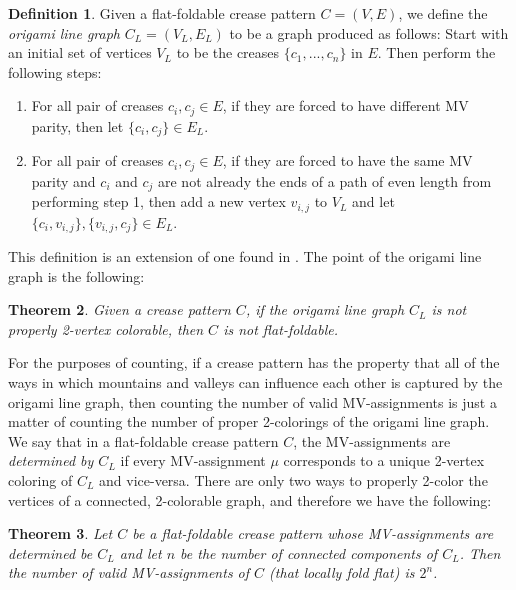 \documentclass{amsart}
\newtheorem{theorem}{Theorem}[section]
\theoremstyle{definition}
\newtheorem{definition}[theorem]{Definition}
\begin{document}
\begin{definition}\label{def:origami line graph}
Given a flat-foldable crease pattern $C=(V,E)$, we define the {\em origami line graph} $C_L=(V_L,E_L)$ to be a graph produced as follows:  Start with an initial set of vertices $V_L$ to be the creases $\{c_1, ..., c_n\}$ in $E$.  Then perform the following steps:
\begin{enumerate}
\setlength{\itemsep}{0pt}
\item For all pair of creases $c_i, c_j\in E$, if they are forced to have different MV parity, then let $\{c_i,c_j\}\in E_L$.
\item For all pair of creases $c_i, c_j\in E$, if they are forced to have the same MV parity and $c_i$ and $c_j$ are not already the ends of a path of even length from performing step 1, then add a new vertex $v_{i,j}$ to $V_L$ and let $\{c_i, v_{i,j}\}, \{v_{i,j},c_j\}\in E_L$. 
\end{enumerate}
\end{definition}

This definition is an extension of one found in \cite{Hull1}.  The point of the origami line graph is the following:

\begin{theorem}\label{thm:lg}
Given a crease pattern $C$, if the origami line graph $C_L$ is not properly 2-vertex colorable, then $C$ is not flat-foldable.
\end{theorem}

For the purposes of counting, if a crease pattern has the property that all of the ways in which mountains and valleys can influence each other is captured by the origami line graph, then counting the number of valid MV-assignments is just a matter of counting the number of proper 2-colorings of the origami line graph.  We say that in a flat-foldable crease pattern $C$, the MV-assignments are {\em determined by $C_L$} if every MV-assignment $\mu$ corresponds to a unique 2-vertex coloring of $C_L$ and vice-versa.    There are only two ways to properly 2-color the vertices of a connected, 2-colorable graph, and therefore we have the following:

\begin{theorem}\label{thm:2color}
Let $C$ be a flat-foldable crease pattern whose MV-assignments are determined be $C_L$ and let $n$ be the number of connected components of $C_L$.  Then the number of valid MV-assignments of $C$ (that locally fold flat) is $2^n$.
\end{theorem} 
\end{document}
